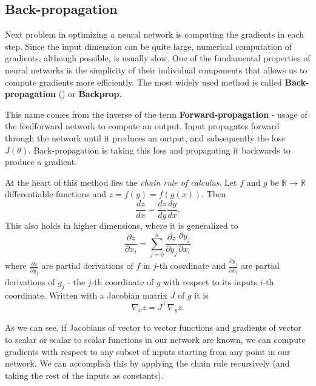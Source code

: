 \subsection{Back-propagation}

Next problem in optimizing a neural network is computing the gradients in each step. Since the input dimension can be quite large, numerical computation of gradients, although possible, is usually slow. One of the fundamental properties of neural networks is the simplicity of their individual components that allows us to compute gradients more efficiently. The most widely used method is called \textbf{Back-propagation} (\cite{backprop}) or \textbf{Backprop}.

This name comes from the inverse of the term \textbf{Forward-propagation} - usage of the feedforward network to compute an output. Input propagates forward through the network until it produces an output, and subsequently the loss $J(\theta)$. Back-propagation is taking this loss and propagating it backwards to produce a gradient.

At the heart of this method lies the \textit{chain rule of calculus}. Let $f$ and $g$ be $\mathbb{R}\rightarrow\mathbb{R}$ differentiable functions and $z=f(y)=f(g(x))$. Then $$\frac{dz}{d x}=\frac{d z}{d y}\frac{d y}{d x}.$$ This also holds in higher dimensions, where it is generalized to $$\frac{\partial z}{\partial x_i}=\sum_{j=0}^n\frac{\partial z}{\partial y_j}\frac{\partial y_j}{\partial x_i}$$ where $\frac{\partial z}{\partial y_j}$ are partial derivations of $f$ in $j$-th coordinate and $\frac{\partial y_j}{\partial x_i}$ are partial derivations of $g_j$ - the $j$-th coordinate of $g$ with respect to its inputs $i$-th coordinate. Written with a Jacobian matrix $J$ of $g$ it is $$\nabla_x z = J^\top \nabla_y z.$$

As we can see, if Jacobians of vector to vector functions and gradients of vector to scalar or scalar to scalar functions in our network are known, we can compute gradients with respect to any subset of inputs starting from any point in our network. We can accomplish this by applying the chain rule recursively (and taking the rest of the inputs as constants).

